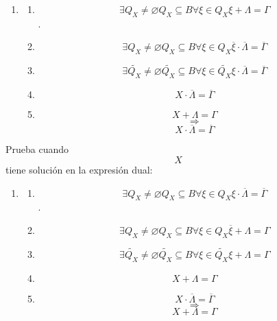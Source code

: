 \begin{enumerate}
\begin{enumerate}
\begin{enumerate}
\begin{enumerate}
\begin{enumerate}
          \begin{enumerate}
          \def\labelenumvi{\arabic{enumvi}.}
          \tightlist
          \item
            \begin{enumerate}
            \def\labelenumvii{\arabic{enumvii}.}
            \tightlist
            \item
              \[\exists{Q_{X} \neq \varnothing}{Q_{X} \subseteq B}\forall{\xi \in Q_{X}}{{\xi + \Lambda} = \Gamma}\].
            \item
              \[\exists{Q_{X} \neq \varnothing}{Q_{X} \subseteq B}\forall{\xi \in Q_{X}}{{\overline{\xi} \cdot \overline{\Lambda}} = \overline{\Gamma}}\]
            \item
              \[\exists{\widetilde{Q_{X}} \neq \varnothing}{\widetilde{Q_{X}} \subseteq B}\forall{\xi \in \widetilde{Q_{X}}}{{\xi \cdot \overline{\Lambda}} = \overline{\Gamma}}\]
            \item
              \[{X \cdot \overline{\Lambda}} = \overline{\Gamma}\]
            \item
              \[{X + \Lambda} = \Gamma\] \[\Rightarrow\]
              \[{X \cdot \overline{\Lambda}} = \overline{\Gamma}\]
            \end{enumerate}
          \end{enumerate}

          Prueba cuando \[X\] tiene solución en la expresión dual:

          \begin{enumerate}
          \def\labelenumvi{\arabic{enumvi}.}
          \tightlist
          \item
            \begin{enumerate}
            \def\labelenumvii{\arabic{enumvii}.}
            \tightlist
            \item
              \[\exists{Q_{X} \neq \varnothing}{Q_{X} \subseteq B}\forall{\xi \in Q_{X}}{{\xi \cdot \overline{\Lambda}} = \overline{\Gamma}}\].
            \item
              \[\exists{Q_{X} \neq \varnothing}{Q_{X} \subseteq B}\forall{\xi \in Q_{X}}{{\overline{\xi} + \Lambda} = \Gamma}\]
            \item
              \[\exists{\widetilde{Q_{X}} \neq \varnothing}{\widetilde{Q_{X}} \subseteq B}\forall{\xi \in \widetilde{Q_{X}}}{{\xi + \Lambda} = \Gamma}\]
            \item
              \[{X + \Lambda} = \Gamma\]
            \item
              \[{X \cdot \overline{\Lambda}} = \overline{\Gamma}\]
              \[\Rightarrow\] \[{X + \Lambda} = \Gamma\]
            \end{enumerate}
          \end{enumerate}


\end{enumerate}
\end{enumerate}
\end{enumerate}
\end{enumerate}
\end{enumerate}

